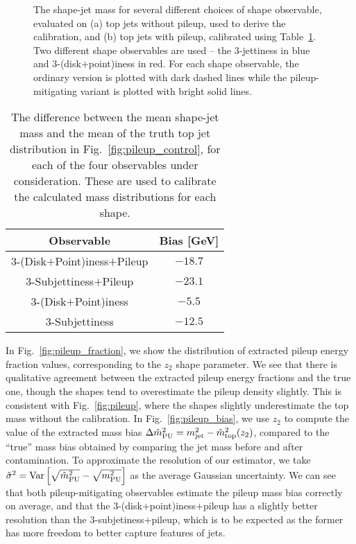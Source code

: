 \documentclass[letterpaper,11pt]{article}
\DeclareRobustCommand{\Tab}[1]{Table~\ref{tab:#1}}
\DeclareRobustCommand{\Fig}[1]{Fig.~\ref{fig:#1}}
\begin{document}
\begin{figure*}[tp]
    \centering
    \caption{
        The shape-jet mass for several different choices of shape observable, evaluated on (a) top jets without pileup, used to derive the calibration, and (b) top jets with pileup, calibrated using \Tab{biases}. Two different shape observables are used -- the 3-jettiness in blue and 3-(disk$+$point)iness in red. For each shape observable, the ordinary version is plotted with dark dashed lines while the pileup-mitigating variant is plotted with bright solid lines. 
        }
    \label{fig:pileup_observables}
\end{figure*}

\begin{table}[tp]
\centering
\begin{tabular}{|c|c|}
\hline\hline
\bf Observable & \bf Bias [GeV]  \\
\hline\hline
  3-(Disk$+$Point)iness$+$Pileup & $-18.7$ \\
  3-Subjettiness$+$Pileup & $-23.1$ \\
  3-(Disk$+$Point)iness  & $-5.5$ \\
  3-Subjettiness & $-12.5$ \\
\hline\hline
\end{tabular}
\caption{\label{tab:biases}
%
The difference between the mean shape-jet mass and the mean of the truth top jet distribution in \Fig{pileup_control}, for each of the four observables under consideration. These are used to calibrate the calculated mass distributions for each shape.
}
\end{table}



In \Fig{pileup_fraction}, we show the distribution of extracted pileup energy fraction values, corresponding to the $z_2$ shape parameter. We see that there is qualitative agreement between the extracted pileup energy fractions and the true one, though the shapes tend to overestimate the pileup density slightly. This is consistent with \Fig{pileup}, where the shapes slightly underestimate the top mass without the calibration. In \Fig{pileup_bias}, we use $z_2$ to compute the value of the extracted mass bias $\Delta \hat{m}^2_{\rm PU} = m^2_{\rm jet} - \hat{m}^2_{\rm top}(z_2)$, compared to the ``true'' mass bias obtained by comparing the jet mass before and after contamination. To approximate the resolution of our estimator, we take $\hat{\sigma}^2 = {\rm Var} \left[\sqrt{\hat{m}^2_{\rm PU}} - \sqrt{m^2_{\rm PU}}\right]$ as the average Gaussian uncertainty. We can see that both pileup-mitigating observables estimate the pileup mass bias correctly on average, and that the 3-(disk$+$point)iness$+$pileup has a slightly better resolution than the 3-subjetiness$+$pileup, which is to be expected as the former has more freedom to better capture features of jets. 
\end{document}
